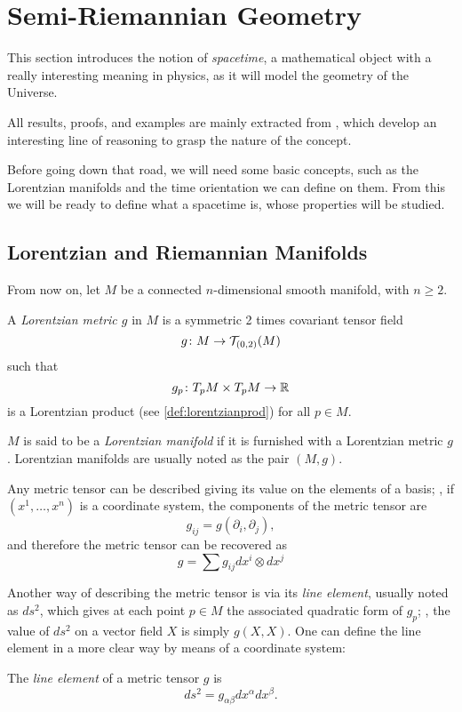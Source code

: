 \chapter{Semi-Riemannian Geometry}
\label{chapter:semiriemannian}

This section introduces the notion of \emph{spacetime}, a mathematical object with a really interesting meaning in physics, as it will model the geometry of the Universe.

All results, proofs, and examples are mainly extracted from \cite{romero10}, which develop an interesting line of reasoning to grasp the nature of the concept.

Before going down that road, we will need some basic concepts, such as the Lorentzian manifolds and the time orientation we can define on them. From this we will be ready to define what a spacetime is, whose properties will be studied.

\section{Lorentzian and Riemannian Manifolds}

From now on, let $M$ be a connected $n$-dimensional smooth manifold, with $n\geq2$.

\begin{definition}
	A \emph{Lorentzian metric $g$} in $M$ is a symmetric 2 times covariant tensor field
	\[
	g \colon M \to {\mathcal T}_{(0,2)}(M)
	\]
	such that
	\[
	g_p \colon T_pM \times T_pM \to \mathbb{R}
	\]
	is a Lorentzian product (see \autoref{def:lorentzianprod}) for all $p \in M$.
\end{definition}

\begin{definition}
	$M$ is said to be a \emph{Lorentzian manifold} if it is furnished with a Lorentzian metric $g$. Lorentzian manifolds are usually noted as the pair $(M,g)$.
\end{definition}

Any metric tensor can be described giving its value on the elements of a basis; \ie, if $(x^1, \dots, x^n)$ is a coordinate system, the components of the metric tensor are
\[
	g_{ij} = g(\partial_i, \partial_j),
\]
and therefore the metric tensor can be recovered as
\[
	g = \sum g_{ij} dx^i \otimes dx^j
\]

Another way of describing the metric tensor \cite[p. 13]{oneill95} is via its \emph{line element}, usually noted as $ds^2$, which gives at each point $p\in M$ the associated quadratic form of $g_p$; \ie, the value of $ds^2$ on a vector field $X$ is simply $g(X,X)$. One can define the line element in a more clear way by means of a coordinate system:
\begin{definition}
	The \emph{line element} of a metric tensor $g$ is
	\[
		ds^2 = g_{\alpha\beta} dx^\alpha dx^\beta.
	\]
\end{definition}

